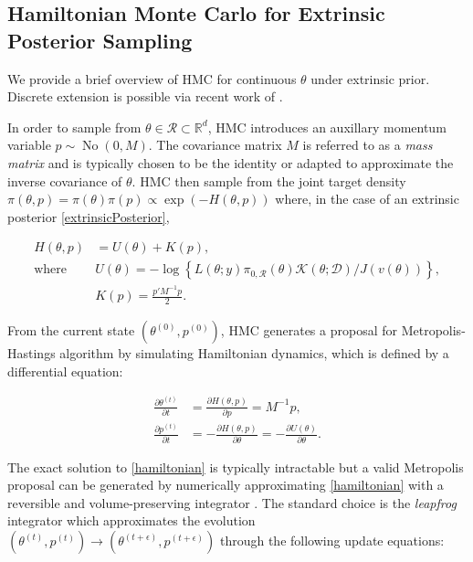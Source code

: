 \documentclass[10pt]{article}
\newcommand{\mc}[1]{\mathcal{#1}}
\DeclareMathOperator{\No}{No}
\DeclareMathOperator{\1}{\mathbbm{1}}
\newcommand{\dt}{\epsilon} %
\newcommand{\mass}{M} %
\begin{document}
\subsection{Hamiltonian Monte Carlo for Extrinsic Posterior Sampling}

We provide a brief overview of HMC for continuous $\theta$ under extrinsic prior. Discrete extension is possible via recent work of \cite{nishimura2017discontinuous}.

In order to sample from $\theta\in\mc R \subset \mathbb R^d$, HMC introduces an auxillary momentum variable $p \sim \No(0, \mass)$. The covariance matrix $\mass$ is referred to as a \textit{mass matrix} and is typically chosen to be the identity or adapted to approximate the inverse covariance of $\theta$. HMC then sample from the joint target density $\pi(\theta, p) = \pi(\theta) \pi(p) \propto \exp (- H(\theta, p))$ where, in the case of an extrinsic posterior \eqref{extrinsicPosterior}, 


\begin{equation}
\begin{aligned}
H(\theta, p)& = U(\theta)+K(p),\\
\text{where } & U(\theta) = -\log\left\{ L(\theta;y)\pi_{0,\mc R}(\theta) \mc{K}(\theta;\mc D) / J(v(\theta)) \right\},\\
& K(p) = \frac{p'\mass^{-1} p}{2}.
\end{aligned}
\end{equation}

From the current state $(\theta^{(0)},p^{(0)})$, HMC generates a proposal for Metropolis-Hastings algorithm by simulating Hamiltonian dynamics, which is defined by a differential equation:

\begin{equation}
\begin{aligned}
\label{hamiltonian}
\frac{\partial \theta ^{(t)}}{\partial t} & =\frac{\partial H(\theta, p)}{\partial p} = \mass^{-1}p,\\
\frac{\partial p^{(t)}}{\partial t}& =-\frac{\partial H(\theta, p)}{\partial \theta} = -\frac{\partial U(\theta)}{\partial \theta}.
\end{aligned}
\end{equation}

The exact solution to \eqref{hamiltonian} is typically intractable but a valid Metropolis proposal can be generated by numerically approximating \eqref{hamiltonian} with a reversible and volume-preserving  integrator \citep{neal2011mcmc}. The standard choice is the \textit{leapfrog} integrator which approximates the evolution $(\theta^{(t)},p^{(t)}) \to (\theta^{(t + \dt)},p^{(t + \dt)})$ through the following update equations:
\end{document}
